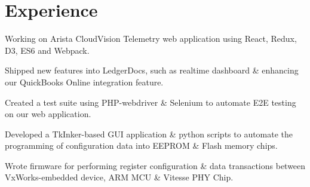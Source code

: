 \documentclass[]{constants}
\begin{document}
\begin{minipage}[t]{0.66\textwidth} 


\section{Experience}

\vspace{\topsep} %
\begin{tightemize}
\item Working on Arista CloudVision Telemetry web application using React, Redux, D3, ES6 and Webpack.
\end{tightemize}
\sectionsep

\begin{tightemize}
\item Shipped new features into LedgerDocs, such as realtime dashboard \& enhancing our QuickBooks Online integration feature.
\item Created a test suite using PHP-webdriver \& Selenium to automate E2E testing on our web application.
\end{tightemize}
\sectionsep

\begin{tightemize}
\item Developed a TkInker-based GUI application \& python scripts to automate the programming of configuration data into EEPROM \& Flash memory chips.
\item Wrote firmware for performing register configuration \& data transactions between VxWorks-embedded device, ARM MCU \& Vitesse PHY Chip.
\end{tightemize}
\sectionsep


\end{minipage}
\end{document}
